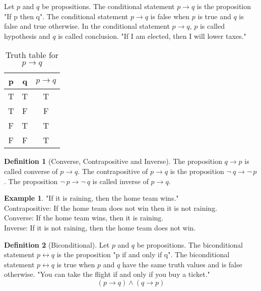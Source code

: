 \documentclass[12pt,oneside,a4paper]{book}
\theoremstyle{remark}
\theoremstyle{definition}
\newtheorem{defn}{Definition}
\newtheorem*{ex}{Example}
\newcommand{\ptoq}{p \to q}
\begin{document}
Let \(p\) and \(q\) be propositions. The conditional statement \(p \to q\) is the proposition "If p then q". The conditional statement \(p\to q\) is false when \(p\) is true and \(q\) is false and true otherwise. In the conditional statement \(p\to q\), \(p\) is called hypothesis and \(q\) is called conclusion.
"If I am elected, then I will lower taxes."
\begin{table}[H]
    \centering
    \begin{tabular}{|c|c|c|}
        \hline
        p & q & \(p\to q\) \\ \hline
        T & T & T          \\ \hline
        T & F & F          \\ \hline
        F & T & T          \\ \hline
        F & F & T          \\ \hline
    \end{tabular}
    \caption{Truth table for \(p\to q\)}
\end{table}
\begin{defn}[Converse, Contrapositive and Inverse]
    The proposition \(q\to p\) is called converse of \(\ptoq\).
    The contrapositive of \(\ptoq\) is the proposition \(\neg\ q \to \neg\ p\).
    The proposition \(\neg\ p \to \neg\ q\) is called inverse of \(\ptoq\).
\end{defn}
\begin{ex}
    "If it is raining, then the home team wins."\\
    Contrapositive: If the home team does not win then it is not raining.\\
    Converse: If the home team wins, then it is raining.\\
    Inverse: If it is not raining, then the home  team does not win.
\end{ex}
\begin{defn}[Biconditional]
    Let $ p $ and $ q $ be propositions. The biconditional statement \(p\leftrightarrow q\) is the proposition "p if and only if q". The biconditional statement \(p\leftrightarrow q\) is true when $ p $ and $ q $ have the same truth values and is false otherwise.
    "You can take the flight if and only if you buy a ticket."
    \[(\ptoq)\wedge(q\to p)\]
\end{defn}
\end{document}
